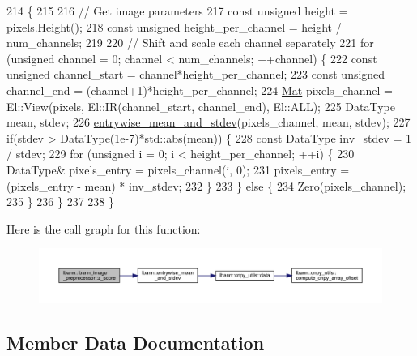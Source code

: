 \begin{DoxyCode}
214                                                               \{
215 
216   \textcolor{comment}{// Get image parameters}
217   \textcolor{keyword}{const} \textcolor{keywordtype}{unsigned} height = pixels.Height();
218   \textcolor{keyword}{const} \textcolor{keywordtype}{unsigned} height\_per\_channel = height / num\_channels;
219 
220   \textcolor{comment}{// Shift and scale each channel separately}
221   \textcolor{keywordflow}{for} (\textcolor{keywordtype}{unsigned} channel = 0; channel < num\_channels; ++channel) \{
222     \textcolor{keyword}{const} \textcolor{keywordtype}{unsigned} channel\_start = channel*height\_per\_channel;
223     \textcolor{keyword}{const} \textcolor{keywordtype}{unsigned} channel\_end = (channel+1)*height\_per\_channel;
224     \hyperlink{base_8hpp_a68f11fdc31b62516cb310831bbe54d73}{Mat} pixels\_channel = El::View(pixels, El::IR(channel\_start, channel\_end), El::ALL);
225     DataType mean, stdev;
226     \hyperlink{namespacelbann_a604ae9da0173b8be2bfb6877997d6d5c}{entrywise\_mean\_and\_stdev}(pixels\_channel, mean, stdev);
227     \textcolor{keywordflow}{if}(stdev > DataType(1e-7)*std::abs(mean)) \{
228       \textcolor{keyword}{const} DataType inv\_stdev = 1 / stdev;
229       \textcolor{keywordflow}{for} (\textcolor{keywordtype}{unsigned} i = 0; i < height\_per\_channel; ++i) \{
230         DataType& pixels\_entry = pixels\_channel(i, 0);
231         pixels\_entry = (pixels\_entry - mean) * inv\_stdev;
232       \}
233     \} \textcolor{keywordflow}{else} \{
234       Zero(pixels\_channel);
235     \}
236   \}
237 
238 \}
\end{DoxyCode}
Here is the call graph for this function\+:\nopagebreak
\begin{figure}[H]
\begin{center}
\leavevmode
\includegraphics[width=350pt]{classlbann_1_1lbann__image__preprocessor_aec67fb0dc7a1f5d718d5bb2e226f9b7a_cgraph}
\end{center}
\end{figure}


\subsection{Member Data Documentation}
\mbox{\label{classlbann_1_1lbann__image__preprocessor_a032397d6c642dccd43f4c38393f5d2c1}} 
